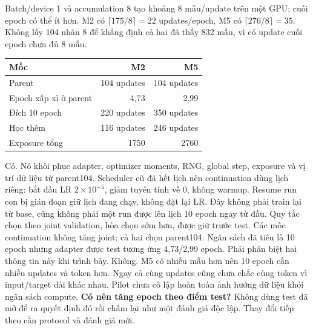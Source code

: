 \documentclass[12pt,a4paper]{article}
\begin{document}
Batch/device 1 và accumulation 8 tạo khoảng 8 mẫu/update trên một GPU; cuối epoch có thể ít hơn. M2 có \(\lceil175/8\rceil=22\) updates/epoch, M5 có \(\lceil276/8\rceil=35\). Không lấy 104 nhân 8 để khẳng định cả hai đã thấy 832 mẫu, vì có update cuối epoch chưa đủ 8 mẫu.
\begin{center}
\begin{tabular}{lrr}\toprule
Mốc & M2 & M5\\\midrule
Parent &104 updates &104 updates\\
Epoch xấp xỉ ở parent &4,73 &2,99\\
Đích 10 epoch &220 updates &350 updates\\
Học thêm &116 updates &246 updates\\
Exposure tổng &1750 &2760\\\bottomrule
\end{tabular}\end{center}
Có. Nó khôi phục adapter, optimizer moments, RNG, global step, exposure và vị trí dữ liệu từ parent104. Scheduler cũ đã hết lịch nên continuation dùng lịch riêng: bắt đầu LR \(2\times10^{-5}\), giảm tuyến tính về 0, không warmup. Resume run con bị gián đoạn giữ lịch đang chạy, không đặt lại LR. Đây không phải train lại từ base, cũng không phải một run được lên lịch 10 epoch ngay từ đầu.
Quy tắc chọn theo joint validation, hòa chọn sớm hơn, được giữ trước test. Các mốc continuation không tăng joint; cả hai chọn parent104. Ngân sách đã tiêu là 10 epoch nhưng adapter được test tương ứng 4,73/2,99 epoch. Phải phân biệt hai thông tin này khi trình bày.
Không. M5 có nhiều mẫu hơn nên 10 epoch cần nhiều updates và token hơn. Ngay cả cùng updates cũng chưa chắc cùng token vì input/target dài khác nhau. Pilot chưa cô lập hoàn toàn ảnh hưởng dữ liệu khỏi ngân sách compute.
\textbf{Có nên tăng epoch theo điểm test?} Không dùng test đã mở để ra quyết định đó rồi chấm lại như một đánh giá độc lập. Thay đổi tiếp theo cần protocol và đánh giá mới.

\nextpage
\end{document}
